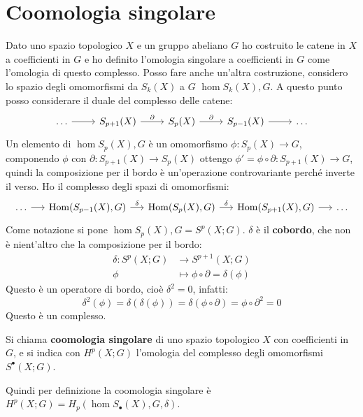 \section{Coomologia singolare}

Dato uno spazio topologico $ X $ e un gruppo abeliano $ G $ ho costruito le
catene in $ X $ a coefficienti in $ G $ e ho definito l'omologia singolare a
coefficienti in $ G $ come l'omologia di questo complesso. Posso fare anche un'altra
costruzione, considero lo spazio degli omomorfismi da $ S_k(X) $ a $ G $
$ \hom{S_k(X), G} $. A questo punto posso considerare il duale del complesso delle catene:
\[
  \begin{tikzcd}
    \dots \rar & S_{p+1}(X) \rar{\partial} & S_p(X) \rar{\partial} & S_{p-1}(X) \rar & \dots
  \end{tikzcd}
\]
Un elemento di $ \hom{S_p(X), G} $ è un omomorfismo $ \phi \colon S_p(X) \to G $, componendo $ \phi $
con $ \partial \colon S_{p+1}(X) \to S_p(X) $ ottengo  $ \phi' = \phi \circ \partial \colon S_{p+1}(X) \to G $, quindi la composizione
per il bordo è un'operazione controvariante perché inverte il verso. Ho il complesso degli spazi
di omomorfismi:
\[
  \begin{tikzcd}[nodes = {column sep = 14 pt}]
    \dots \rar & \hom{S_{p-1}(X),G} \rar{\delta} & \hom{S_p(X),G} \rar{\delta} & \hom{S_{p+1}(X),G} \rar & \dots
  \end{tikzcd}
\]
Come notazione si pone $ \hom{S_p(X),G} = S^p(X;G) $. $ \delta $ è il \textbf{cobordo},
che non è nient'altro che la composizione per il bordo:
\begin{align*}
  \delta \colon S^p(X;G) & \to S^{p+1}(X;G) \\
  \phi & \mapsto \phi \circ \partial = \delta(\phi)
\end{align*}
Questo è un operatore di bordo, cioè $ \delta^2 = 0 $, infatti:
\[
  \delta^2(\phi) = \delta(\delta(\phi)) = \delta (\phi \circ \partial) = \phi \circ \partial^2 = 0
\]
Questo è un complesso.
\begin{definition}
  Si chiama \textbf{coomologia singolare} di uno
  spazio topologico $ X $ con coefficienti in $ G $, e si indica con
  $ H^p(X; G) $ l'omologia del complesso degli omomorfismi $ S^\bullet(X;G) $.
\end{definition}
Quindi per definizione la coomologia singolare è $ H^p(X;G) = H_p(\hom{S_\bullet(X), G}, \delta) $.

